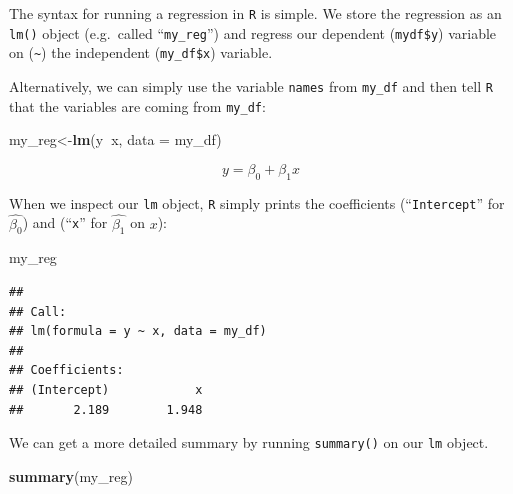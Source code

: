 \documentclass[]{book}
\newenvironment{Shaded}{\begin{snugshade}}{\end{snugshade}}
\newcommand{\KeywordTok}[1]{\textcolor[rgb]{0.13,0.29,0.53}{\textbf{#1}}}
\newcommand{\DataTypeTok}[1]{\textcolor[rgb]{0.13,0.29,0.53}{#1}}
\newcommand{\OperatorTok}[1]{\textcolor[rgb]{0.81,0.36,0.00}{\textbf{#1}}}
\newcommand{\NormalTok}[1]{#1}
\theoremstyle{definition}
\theoremstyle{definition}
\theoremstyle{definition}
\theoremstyle{remark}
\begin{document}
The syntax for running a regression in \texttt{R} is simple. We store
the regression as an \texttt{lm()} object (e.g.~called
``\texttt{my\_reg}'') and regress our dependent (\texttt{mydf\$y})
variable on (\texttt{\textasciitilde{}}) the independent
(\texttt{my\_df\$x}) variable.

\begin{Shaded}
\end{Shaded}

Alternatively, we can simply use the variable \texttt{names} from
\texttt{my\_df} and then tell \texttt{R} that the variables are coming
from \texttt{my\_df}:

\begin{Shaded}
\begin{Highlighting}[]
\NormalTok{my_reg<-}\KeywordTok{lm}\NormalTok{(y}\OperatorTok{~}\NormalTok{x, }\DataTypeTok{data =}\NormalTok{ my_df)}
\end{Highlighting}
\end{Shaded}

\[y=\beta_0+\beta_1 x\]

When we inspect our \texttt{lm} object, \texttt{R} simply prints the
coefficients (``\texttt{Intercept}'' for \(\hat{\beta_0}\)) and
(``\texttt{x}'' for \(\hat{\beta_1}\) on \(x\)):

\begin{Shaded}
\begin{Highlighting}[]
\NormalTok{my_reg}
\end{Highlighting}
\end{Shaded}

\begin{verbatim}
## 
## Call:
## lm(formula = y ~ x, data = my_df)
## 
## Coefficients:
## (Intercept)            x  
##       2.189        1.948
\end{verbatim}

We can get a more detailed summary by running \texttt{summary()} on our
\texttt{lm} object.

\begin{Shaded}
\begin{Highlighting}[]
\KeywordTok{summary}\NormalTok{(my_reg)}
\end{Highlighting}
\end{Shaded}
\end{document}
